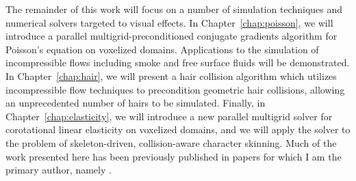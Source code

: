 The remainder of this work will focus on a number of simulation
techniques and numerical solvers targeted to visual effects.  In
Chapter~\ref{chap:poisson}, we will introduce a parallel
multigrid-preconditioned conjugate gradients algorithm for Poisson's
equation on voxelized domains. Applications to the simulation of
incompressible flows including smoke and free surface fluids will be
demonstrated.  In Chapter~\ref{chap:hair}, we will
present a hair collision algorithm which utilizes incompressible flow
techniques to precondition geometric hair collisions, allowing an
unprecedented number of hairs to be simulated.  Finally, in
Chapter~\ref{chap:elasticity}, we will introduce a new parallel multigrid
solver for corotational linear elasticity on voxelized domains, and we
will apply the solver to the problem of skeleton-driven,
collision-aware character skinning.  Much of the work presented here
has been previously published in papers for which I am the primary
author, namely \cite{mcadams:2009:hair,mcadams:2010:mgpcg}.
